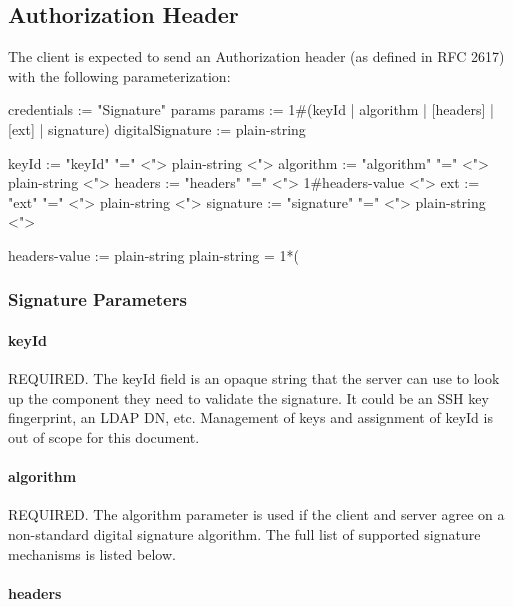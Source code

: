 \subsection*{Authorization Header}

The client is expected to send an Authorization header (as defined in R\+FC 2617) with the following parameterization\+: \begin{DoxyVerb}credentials := "Signature" params
params := 1#(keyId | algorithm | [headers] | [ext] | signature)
digitalSignature := plain-string

keyId := "keyId" "=" <"> plain-string <">
algorithm := "algorithm" "=" <"> plain-string <">
headers := "headers" "=" <"> 1#headers-value <">
ext := "ext" "=" <"> plain-string <">
signature := "signature" "=" <"> plain-string <">

headers-value := plain-string
plain-string   = 1*( %
\end{DoxyVerb}


\subsubsection*{Signature Parameters}

\paragraph*{key\+Id}

R\+E\+Q\+U\+I\+R\+ED. The {\ttfamily key\+Id} field is an opaque string that the server can use to look up the component they need to validate the signature. It could be an S\+SH key fingerprint, an L\+D\+AP DN, etc. Management of keys and assignment of {\ttfamily key\+Id} is out of scope for this document.

\paragraph*{algorithm}

R\+E\+Q\+U\+I\+R\+ED. The {\ttfamily algorithm} parameter is used if the client and server agree on a non-\/standard digital signature algorithm. The full list of supported signature mechanisms is listed below.

\paragraph*{headers}

